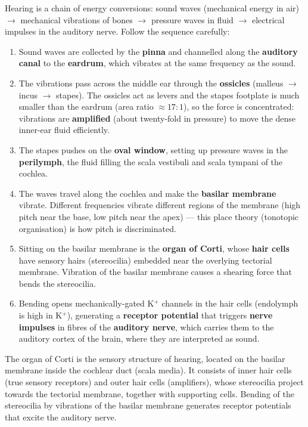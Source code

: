 \documentclass[11pt]{article}
\newcommand{\cle}[1]{{\popxbold\color{popdark}#1}}
\newcounter{popsec}
\newcounter{popsub}
\newcommand{\courssub}[1]{%
  \stepcounter{popsub}%
  \par\vspace{9pt}\noindent{\popxbold\fontsize{11.5}{13}\selectfont\color{popink}{\color{poporange}\thepopsec.\thepopsub}\hspace{6pt}#1}\par\nopagebreak\vspace{4pt}
}
\begin{document}
\courssub{The Mechanism of Hearing}

Hearing is a chain of energy conversions: sound waves (mechanical energy in air) $\rightarrow$ mechanical vibrations of bones $\rightarrow$ pressure waves in fluid $\rightarrow$ electrical impulses in the auditory nerve. Follow the sequence carefully:

\begin{methode}
\begin{enumerate}
\item Sound waves are collected by the \textbf{pinna} and channelled along the \textbf{auditory canal} to the \textbf{eardrum}, which vibrates at the same frequency as the sound.
\item The vibrations pass across the middle ear through the \textbf{ossicles} (malleus $\rightarrow$ incus $\rightarrow$ stapes). The ossicles act as levers and the stapes footplate is much smaller than the eardrum (area ratio $\approx 17:1$), so the force is concentrated: vibrations are \textbf{amplified} (about twenty-fold in pressure) to move the dense inner-ear fluid efficiently.
\item The stapes pushes on the \textbf{oval window}, setting up pressure waves in the \textbf{perilymph}, the fluid filling the scala vestibuli and scala tympani of the cochlea.
\item The waves travel along the cochlea and make the \textbf{basilar membrane} vibrate. Different frequencies vibrate different regions of the membrane (high pitch near the base, low pitch near the apex) — this \cle{place theory} (tonotopic organisation) is how pitch is discriminated.
\item Sitting on the basilar membrane is the \textbf{organ of Corti}, whose \textbf{hair cells} have sensory hairs (stereocilia) embedded near the overlying tectorial membrane. Vibration of the basilar membrane causes a shearing force that bends the stereocilia.
\item Bending opens mechanically-gated K$^+$ channels in the hair cells (endolymph is high in K$^+$), generating a \textbf{receptor potential} that triggers \textbf{nerve impulses} in fibres of the \textbf{auditory nerve}, which carries them to the auditory cortex of the brain, where they are interpreted as sound.
\end{enumerate}
\end{methode}

\begin{definition}
The \cle{organ of Corti} is the sensory structure of hearing, located on the basilar membrane inside the cochlear duct (scala media). It consists of \cle{inner hair cells} (true sensory receptors) and \cle{outer hair cells} (amplifiers), whose stereocilia project towards the tectorial membrane, together with supporting cells. Bending of the stereocilia by vibrations of the basilar membrane generates receptor potentials that excite the auditory nerve.
\end{definition}
\end{document}
